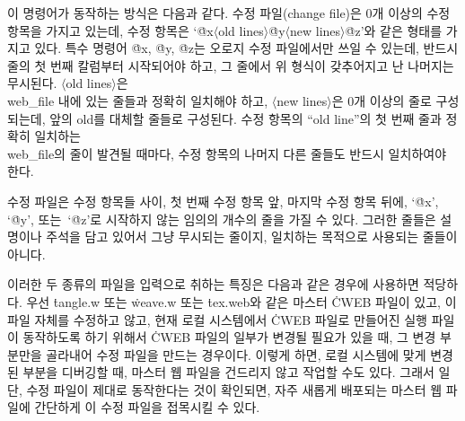 \more 이 명령어가 동작하는 방식은 다음과 같다. 수정 파일(change
file)은 0개 이상의 수정 항목을 가지고 있는데, 수정 항목은
`\.{@x}$\langle$old lines$\rangle$\.{@y}$\langle$new
lines$\rangle$\.{@z}'와 같은 형태를 가지고 있다. 특수 명령어 \.{@x},
\.{@y}, \.{@z}는 오로지 수정 파일에서만 쓰일 수 있는데, 반드시 줄의
첫 번째 칼럼부터 시작되어야 하고, 그 줄에서 위 형식이 갖추어지고 난 나머지는 무시된다.
$\langle$old lines$\rangle$은 \\{web\_file} 내에 있는 줄들과 정확히
일치해야 하고, $\langle$new lines$\rangle$은 0개 이상의 줄로
구성되는데, 앞의 old를 대체할 줄들로 구성된다. 수정 항목의 ``old
line''의 첫 번째 줄과 정확히 일치하는 \\{web\_file}의 줄이 발견될 때마다,
수정 항목의 나머지 다른 줄들도 반드시 일치하여야 한다.

\more 수정 파일은 수정 항목들 사이, 첫 번째 수정 항목 앞, 마지막 수정 항목 뒤에,
`\.{@x}', `\.{@y}', 또는~`\.{@z}'로 시작하지 않는 임의의
개수의 줄을 가질 수 있다. 그러한 줄들은 설명이나 주석을 담고 있어서 
그냥 무시되는 줄이지, 일치하는 목적으로 사용되는 줄들이 아니다.

\more 이러한 두 종류의 파일을 입력으로 취하는 특징은 다음과 같은
경우에 사용하면 적당하다. 우선 \.{tangle.w} 또는 \.{weave.w} 또는
\.{tex.web}와 같은 마스터 \.{CWEB} 파일이 있고, 이 파일
자체를 수정하고 않고, 현재 로컬 시스템에서 \.{CWEB} 파일로 만들어진
실행 파일이 동작하도록 하기 위해서 \.{CWEB} 파일의 일부가 변경될
필요가 있을 때, 그 변경 부분만을 골라내어 수정 파일을 만드는 경우이다.
이렇게 하면, 로컬 시스템에 맞게 변경된 부분을 디버깅할 때, 마스터
웹 파일을 건드리지 않고 작업할 수도 있다. 그래서 일단, 수정 파일이
제대로 동작한다는 것이 확인되면, 자주 새롭게 배포되는 마스터 웹 파일에
간단하게 이 수정 파일을 접목시킬 수 있다.

